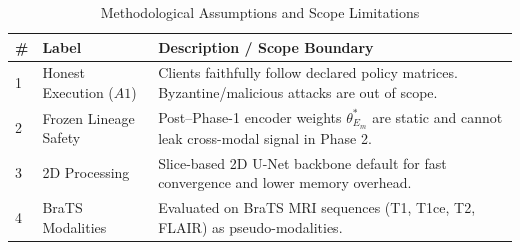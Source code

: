 \documentclass[11pt,a4paper]{article}
\begin{document}
\begin{table}[h!]
\centering
\caption{Methodological Assumptions and Scope Limitations}
\label{tab:assumptions}
\small
\begin{tabular}{@{}llp{8cm}@{}}
\toprule
\textbf{\#} & \textbf{Label} & \textbf{Description / Scope Boundary} \\ \midrule
1 & Honest Execution ($A1$) & Clients faithfully follow declared policy matrices. Byzantine/malicious attacks are out of scope. \\
2 & Frozen Lineage Safety & Post--Phase-1 encoder weights $\theta_{E_m}^*$ are static and cannot leak cross-modal signal in Phase 2. \\
3 & 2D Processing & Slice-based 2D U-Net backbone default for fast convergence and lower memory overhead. \\
4 & BraTS Modalities & Evaluated on BraTS MRI sequences (T1, T1ce, T2, FLAIR) as pseudo-modalities. \\ \bottomrule
\end{tabular}
\end{table}
\end{document}
